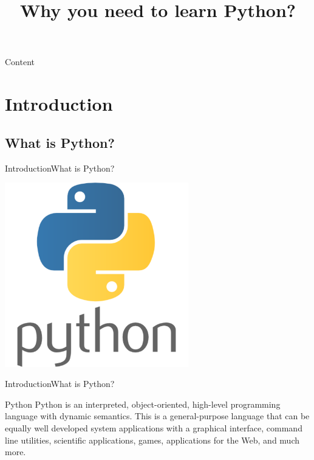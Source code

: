 \documentclass[10pt]{beamer}
\title[Why you need to learn Python?] %
{
	\textbf{Why you need to learn Python?}
}
\begin{document}
	
{\1%
	\begin{frame} 
		\titlepage
	\end{frame}
}

\begin{frame}{Content}{}
	\tableofcontents
\end{frame}
		
\section{Introduction}

\subsection{What is Python?}


\begin{frame}{Introduction}{What is Python?}
	\begin{center}
		\includegraphics[width=0.6\textwidth]{pictures/python.png}
	\end{center}
\end{frame}

\begin{frame}{Introduction}{What is Python?}
	\begin{block}{Python}
		Python is an interpreted, object-oriented, high-level programming language with dynamic semantics.  This is a general-purpose language that can be equally well developed system applications with a graphical interface, command line utilities, scientific applications, games, applications for the Web, and much more.	
	\end{block}
\end{frame}
\end{document}
